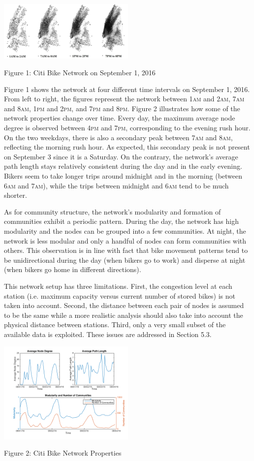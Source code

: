 \documentclass[times, 10pt,twocolumn]{article}
\begin{document}
\centerline{\includegraphics[width=0.5\textwidth]{m2/combined.jpg}}
\centerline{Figure 1: Citi Bike Network on September 1, 2016}
\hfill \break
\indent Figure 1 shows the network at four different time intervals on September 1, 2016. From left to right, the figures represent the network between 1\textsc{am} and 2\textsc{am}, 7\textsc{am} and 8\textsc{am}, 1\textsc{pm} and 2\textsc{pm}, and 7\textsc{pm} and 8\textsc{pm}. Figure 2 illustrates how some of the network properties change over time. Every day, the maximum average node degree is observed between 4\textsc{pm} and 7\textsc{pm}, corresponding to the evening rush hour. On the two weekdays, there is also a secondary peak between 7\textsc{am} and 8\textsc{am}, reflecting the morning rush hour. As expected, this secondary peak is not present on September 3 since it is a Saturday. On the contrary, the network's average path length stays relatively consistent during the day and in the early evening. Bikers seem to take longer trips around midnight and in the morning (between 6\textsc{am} and 7\textsc{am}), while the trips between midnight and 6\textsc{am} tend to be much shorter.

As for community structure, the network's modularity and formation of communities exhibit a periodic pattern. During the day, the network has high modularity and the nodes can be grouped into a few communities. At night, the network is less modular and only a handful of nodes can form communities with others. This observation is in line with fact that bike movement patterns tend to be unidirectional during the day (when bikers go to work) and disperse at night (when bikers go home in different directions).

This network setup has three limitations. First, the congestion level at each station (i.e. maximum capacity versus current number of stored bikes) is not taken into account. Second, the distance between each pair of nodes is assumed to be the same while a more realistic analysis should also take into account the physical distance between stations. Third, only a very small subset of the available data is exploited. These issues are addressed in Section 5.3.

\centerline{\includegraphics[width=0.5\textwidth]{m2/plotterfigure.png}}
\centerline{Figure 2: Citi Bike Network Properties}
\end{document}
